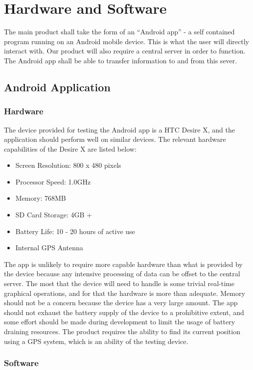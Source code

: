 \documentclass[a4paper]{article}
\begin{document}
	\section{Hardware and Software}
		The main product shall take the form of an ``Android app'' - a self contained program running on an Android mobile device. This is what the user will directly interact with. Our product will also require a central server in order to function. The Android app shall be able to transfer information to and from this sever.
		\subsection{Android Application}
			\subsubsection{Hardware}
				The device provided for testing the Android app is a HTC Desire X, and the application should perform well on similar devices. The relevant hardware capabilities of the Desire X are listed below\cite{htcdesirex}:

				\begin{itemize}
					\item Screen Resolution: 800 x 480 pixels
					\item Processor Speed: 1.0GHz
					\item Memory: 768MB
					\item SD Card Storage: 4GB +
					\item Battery Life: 10 - 20 hours of active use
					\item Internal GPS Antenna
				\end{itemize}

				\noindent
				The app is unlikely to require more capable hardware than what is provided by the device because any intensive processing of data can be offset to the central server. The most that the device will need to handle is some trivial real-time graphical operations, and for that the hardware is more than adequate. Memory should not be a concern because the device has a very large amount. The app should not exhaust the battery supply of the device to a prohibitive extent, and some effort should be made during development to limit the usage of battery draining resources. The product requires the ability to find its current position using a GPS system, which is an ability of the testing device.
			\subsubsection{Software}
\end{document}
